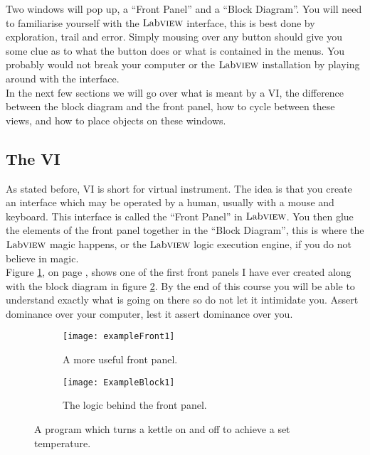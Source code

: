 	Two windows will pop up, a ``Front Panel'' and a ``Block Diagram''. You will need to familiarise yourself with the $\text{Lab}\textsc{view}$ interface, this is best done by exploration, trail and error. Simply mousing over any button should give you some clue as to what the button does or what is contained in the menus. You probably would not break your computer or the $\text{Lab}\textsc{view}$ installation by playing around with the interface.\\
	
	In the next few sections we will go over what is meant by a VI, the difference between the block diagram and the front panel,
	how to cycle between these views, and how to place objects on these windows.
	
	\subsection{The VI}
	As stated before, VI is short for virtual instrument. The idea is that you create an interface which may be operated by a human, usually with a mouse and keyboard. This interface is called the ``Front Panel'' in $\text{Lab}\textsc{view}$. You then glue the elements of the front panel together in the ``Block Diagram'', this is where the $\text{Lab}\textsc{view}$ magic happens, or the $\text{Lab}\textsc{view}$ logic execution engine, if you do not believe in magic.\\
	
	Figure \ref{exampleFront1}, on page \pageref{exampleFront1}, shows one of the first front panels I have ever created along with the block diagram in figure \ref{exampleBlock1}. By the end of this course you will be able to understand exactly what is going on there so do not let it intimidate you. Assert dominance over your computer, lest it assert dominance over you. %
			\begin{figure}
			\centering
			\begin{subfigure}[b]{0.49\textwidth}
				\centering
				\texttt{[image: exampleFront1]}
				\caption{A more useful front panel.}
				\label{exampleFront1}
			\end{subfigure}
			\hfill
			\begin{subfigure}[b]{0.49\textwidth}
				\centering
				\texttt{[image: ExampleBlock1]}
				\caption{The logic behind the front panel.}
				\label{exampleBlock1}
			\end{subfigure}
			\caption{A program which turns a kettle on and off to achieve a set temperature.}
			\label{oldExample}
		\end{figure}
